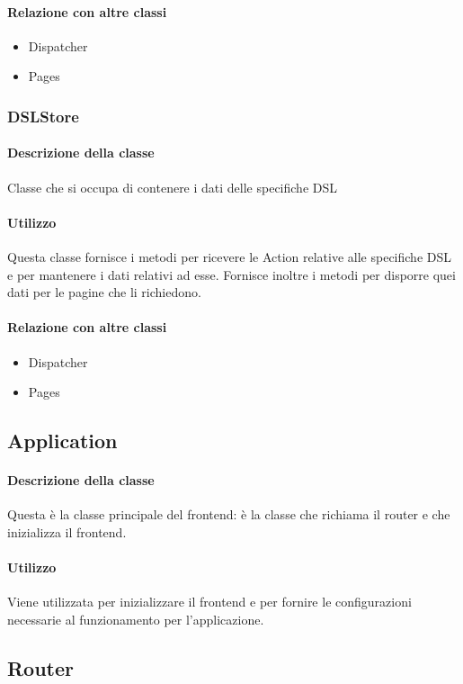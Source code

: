 \paragraph*{Relazione con altre classi}
\begin{itemize}
\item Dispatcher
\item Pages
\end{itemize}

\subsubsection{DSLStore}
\paragraph*{Descrizione della classe}
Classe che si occupa di contenere i dati delle specifiche DSL
\paragraph*{Utilizzo}
Questa classe fornisce i metodi per ricevere le Action relative alle specifiche DSL e per mantenere i dati relativi ad esse. Fornisce inoltre i metodi per disporre quei dati per le pagine che li richiedono.
\paragraph*{Relazione con altre classi}
\begin{itemize}
\item Dispatcher
\item Pages
\end{itemize}


\subsection{Application}
\paragraph*{Descrizione della classe}
Questa è la classe principale del frontend: è la classe che richiama il router e che inizializza il frontend.
\paragraph*{Utilizzo}
Viene utilizzata per inizializzare il frontend e per fornire le configurazioni necessarie al funzionamento per l'applicazione.

\subsection{Router}
